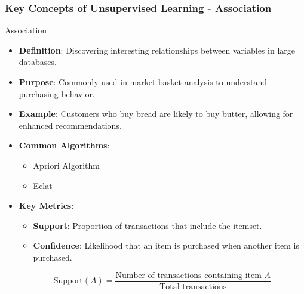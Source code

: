 \documentclass[aspectratio=169]{beamer}
\begin{document}
\begin{frame}[fragile]
    \frametitle{Key Concepts of Unsupervised Learning - Association}
    \begin{block}{Association}
        \begin{itemize}
            \item \textbf{Definition}: Discovering interesting relationships between variables in large databases.
            \item \textbf{Purpose}: Commonly used in market basket analysis to understand purchasing behavior.
            \item \textbf{Example}: Customers who buy bread are likely to buy butter, allowing for enhanced recommendations.
            \item \textbf{Common Algorithms}:
                \begin{itemize}
                    \item Apriori Algorithm
                    \item Eclat
                \end{itemize}
            \item \textbf{Key Metrics}:
                \begin{itemize}
                    \item \textbf{Support}: Proportion of transactions that include the itemset.
                    \item \textbf{Confidence}: Likelihood that an item is purchased when another item is purchased.
                \end{itemize}
                \begin{equation}
                    \text{Support}(A) = \frac{\text{Number of transactions containing item } A}{\text{Total transactions}}
                \end{equation}
        \end{itemize}
    \end{block}
\end{frame}
\end{document}
